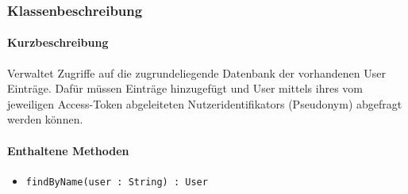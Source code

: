 \subsubsection*{Klassenbeschreibung}%
\paragraph*{Kurzbeschreibung}
Verwaltet Zugriffe auf die zugrundeliegende Datenbank der vorhandenen User Einträge.
Dafür müssen Einträge hinzugefügt und User mittels ihres vom jeweiligen Access-Token abgeleiteten Nutzeridentifikators (Pseudonym) abgefragt werden können.
\paragraph*{Enthaltene Methoden}
\begin{itemize}
    \item \texttt{findByName(user : String) : User}
\end{itemize}
